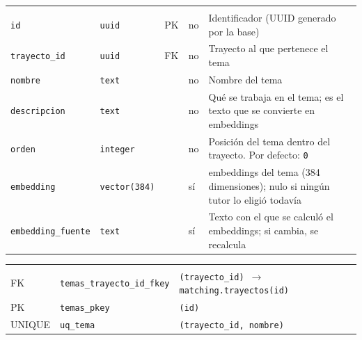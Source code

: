 {\small
\begin{xltabular}{\textwidth}{@{}>{\raggedright\arraybackslash}p{3.6cm} >{\raggedright\arraybackslash}p{2.3cm} >{\raggedright\arraybackslash}p{1cm} >{\centering\arraybackslash}p{0.85cm} L@{}}
    \toprule
     &  &  &  &  \\
    \midrule
    \endfirsthead
    \toprule
     &  &  &  &  \\
    \midrule
    \endhead
    \bottomrule
    \endfoot
    \texttt{id} & \texttt{uuid} & PK & no & Identificador (UUID generado por la base) \\
    \texttt{trayecto\_\allowbreak{}id} & \texttt{uuid} & FK & no & Trayecto al que pertenece el tema \\
    \texttt{nombre} & \texttt{text} &  & no & Nombre del tema \\
    \texttt{descripcion} & \texttt{text} &  & no & Qué se trabaja en el tema; es el texto que se convierte en \gls{embeddings} \\
    \texttt{orden} & \texttt{integer} &  & no & Posición del tema dentro del trayecto. Por defecto: \texttt{0} \\
    \texttt{embedding} & \texttt{vector(\allowbreak{}384)} &  & sí & \gls{embeddings} del tema (384 dimensiones); nulo si ningún tutor lo eligió todavía \\
    \texttt{embedding\_\allowbreak{}fuente} & \texttt{text} &  & sí & Texto con el que se calculó el \gls{embeddings}; si cambia, se recalcula \\
\end{xltabular}
}

{\small
\begin{xltabular}{\textwidth}{@{}>{\raggedright\arraybackslash}p{1.7cm} >{\raggedright\arraybackslash}p{4.6cm} L@{}}
    \toprule
     &  &  \\
    \midrule
    \endfirsthead
    \toprule
     &  &  \\
    \midrule
    \endhead
    \bottomrule
    \endfoot
    FK & \texttt{temas\_\allowbreak{}trayecto\_\allowbreak{}id\_\allowbreak{}fkey} & \texttt{(\allowbreak{}trayecto\_\allowbreak{}id) $\rightarrow$ matching.trayectos(\allowbreak{}id)} \\
    PK & \texttt{temas\_\allowbreak{}pkey} & \texttt{(\allowbreak{}id)} \\
    UNIQUE & \texttt{uq\_\allowbreak{}tema} & \texttt{(\allowbreak{}trayecto\_\allowbreak{}id,\allowbreak{} nombre)} \\
\end{xltabular}
}

